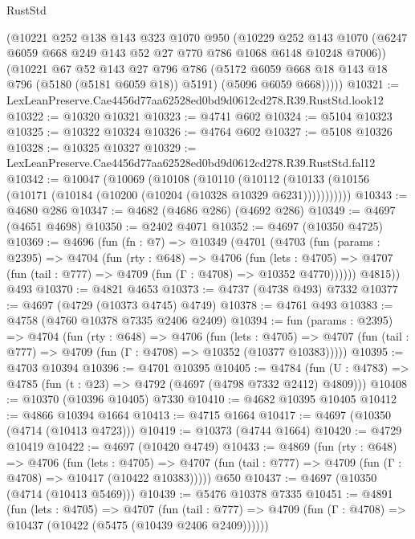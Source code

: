 \begin{lexlean}{RustStd}
\begin{coremodule}
        (@10221
          @252
          @138
          @143
          @323
          @1070
          @950
          (@10229
            @252
            @143
            @1070
            (@6247 @6059 @668 @249 @143 @52 @27 @770 @786 @1068 @6148 @10248 @7006))
          (@10221
            @67
            @52
            @143
            @27
            @796
            @786
            (@5172 @6059 @668 @18 @143 @18 @796 (@5180 (@5181 @6059 @18)) @5191)
            (@5096 @6059 @668)))))
@10321 := LexLeanPreserve.Cae4456d77aa62528ed0bd9d0612cd278.R39.RustStd.look12
@10322 := @10320 @10321
@10323 := @4741 @602
@10324 := @5104 @10323
@10325 := @10322 @10324
@10326 := @4764 @602
@10327 := @5108 @10326
@10328 := @10325 @10327
@10329 := LexLeanPreserve.Cae4456d77aa62528ed0bd9d0612cd278.R39.RustStd.fal12
@10342 := @10047
    (@10069
      (@10108
        (@10110
          (@10112 (@10133 (@10156 (@10171 (@10184 (@10200 (@10204 (@10328 @10329 @6231)))))))))))
@10343 := @4680 @286
@10347 := @4682 (@4686 @286) (@4692 @286)
@10349 := @4697 (@4651 @4698)
@10350 := @2402 @4071
@10352 := @4697 (@10350 @4725)
@10369 := @4696
    (fun (fn : @7) =>
    @10349
      (@4701
        (@4703
          (fun (params : @2395) =>
          @4704
            (fun (rty : @648) =>
            @4706
              (fun (lets : @4705) =>
              @4707 (fun (tail : @777) => @4709 (fun (Γ : @4708) => @10352 @4770))))))
        @4815))
    @493
@10370 := @4821 @4653
@10373 := @4737 (@4738 @493) @7332
@10377 := @4697 (@4729 (@10373 @4745) @4749)
@10378 := @4761 @493
@10383 := @4758 (@4760 @10378 @7335 @2406 @2409)
@10394 := fun (params : @2395) =>
  @4704
    (fun (rty : @648) =>
    @4706
      (fun (lets : @4705) =>
      @4707 (fun (tail : @777) => @4709 (fun (Γ : @4708) => @10352 (@10377 @10383)))))
@10395 := @4703 @10394
@10396 := @4701 @10395
@10405 := @4784
    (fun (U : @4783) => @4785 (fun (t : @23) => @4792 (@4697 (@4798 @7332 @2412) @4809)))
@10408 := @10370 (@10396 @10405) @7330
@10410 := @4682 @10395 @10405
@10412 := @4866 @10394 @1664
@10413 := @4715 @1664
@10417 := @4697 (@10350 (@4714 (@10413 @4723)))
@10419 := @10373 (@4744 @1664)
@10420 := @4729 @10419
@10422 := @4697 (@10420 @4749)
@10433 := @4869
    (fun (rty : @648) =>
    @4706
      (fun (lets : @4705) =>
      @4707 (fun (tail : @777) => @4709 (fun (Γ : @4708) => @10417 (@10422 @10383)))))
    @650
@10437 := @4697 (@10350 (@4714 (@10413 @5469)))
@10439 := @5476 @10378 @7335
@10451 := @4891
    (fun (lets : @4705) =>
    @4707
      (fun (tail : @777) =>
      @4709 (fun (Γ : @4708) => @10437 (@10422 (@5475 (@10439 @2406 @2409))))))

\end{coremodule}
\end{lexlean}
